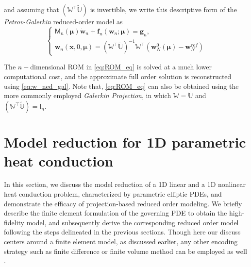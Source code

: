 \documentclass[11pt]{article}
\renewcommand{\vec}[1]{\mathbf{#1}}
\newcommand{\mat}[1]{\mathsf{#1}}
\begin{document}
    and assuming that $(\mathbb{W}^\top \widetilde{\mathbb{U}})$ is invertible, we write this {descriptive form} of the \textit{Petrov-Galerkin} reduced-order model as \cite{stanford_cme345}
    \begin{equation}
    \left\{
    \begin{array}{l}
        \mat{M}_n(\boldsymbol{\mu}) \dot{\vec{w}}_n + \vec{f}_n(\vec{w}_n; \boldsymbol{\mu}) = \vec{g}_n,\\
        \vec{w}_n(\vec{x},0, \boldsymbol{\mu}) = (\mathbb{W}^\top \widetilde{\mathbb{U}})^{-1}\mathbb{W}^\top (\vec{w}_N^0(\boldsymbol{\mu})-\vec{w}^{ref}_N)
    \end{array}
    \right.
    \label{eq:ROM_eq}
    \end{equation}


    The $n-$dimensional ROM in \cref{eq:ROM_eq} is solved at a much lower computational cost, and the approximate full order solution is reconstructed using \cref{eq:w_ned_gal}.
    Note that, \cref{eq:ROM_eq} can also be obtained using the more commonly employed \textit{Galerkin Projection}, in which  $\mathbb{W}=\widetilde{\mathbb{U}}$ and  $(\mathbb{W}^\top \widetilde{\mathbb{U}})=\mat{I}_{n}$.















    \section{Model reduction for 1D parametric heat conduction}
    \label{sec:ROM_example}

    In this section, we discuss the model reduction of a 1D linear and a 1D nonlinear heat conduction problem, characterized by parametric elliptic PDEs, and demonstrate the efficacy of projection-based reduced order modeling.
    We briefly describe the finite element formulation of the governing PDE to obtain the high-fidelity model, and subsequently derive the corresponding reduced order model following the steps delineated in the previous sections.
    Though here our discuss centers around a finite element model, as discussed earlier, any other encoding strategy such as finite difference or finite volume method can be employed as well \cite{farhat2020computational}.
\end{document}

